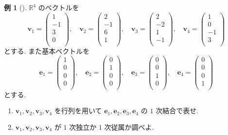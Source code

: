 \documentclass[dvipdfmx,a4paper,11pt]{article} %
\theoremstyle{definition}
\newtheorem{eg}[thm]{例}
\begin{document}
\begin{eg}[{\cite[例題4.2.2]{M}}] 
\(\mathbb{R}^4\) のベクトルを
\[
\bm{v}_1=
\begin{pmatrix}
1\\
 -1\\ 
 3 \\
 0\\
 \end{pmatrix},
\quad
\bm{v}_2=
\begin{pmatrix}
2\\
 -1\\ 
 6 \\
 1\\
 \end{pmatrix},
\quad
\bm{v}_3=
\begin{pmatrix}
2\\
 -2\\ 
 1 \\
 -1\\
 \end{pmatrix},
\quad
\bm{v}_4 =
\begin{pmatrix}
1\\
 0\\ 
 -1\\
 3\\
 \end{pmatrix}
\]
とする. 
また基本ベクトルを
$$
\bm{e}_1=
\begin{pmatrix}
1\\
 0\\ 
 0 \\
 0\\
 \end{pmatrix},
\quad
\bm{e}_2=
\begin{pmatrix}
0\\
 1\\ 
 0 \\
 0\\
 \end{pmatrix},
\quad
\bm{e}_3=
\begin{pmatrix}
0\\
 0\\ 
 1 \\
 0\\
 \end{pmatrix},
\quad
\bm{e}_4 =
\begin{pmatrix}
0\\
 0\\ 
 0\\
 1\\
 \end{pmatrix}
$$
とする.
\begin{enumerate}
\item \(\bm{v}_1,\bm{v}_2,\bm{v}_3,\bm{v}_4\) を行列を用いて \(\bm{e}_1,\bm{e}_2,\bm{e}_3,\bm{e}_4\) の \(1\) 次結合で表せ.
\item \(\bm{v}_1,\bm{v}_2,\bm{v}_3,\bm{v}_4\) が \(1\) 次独立か \(1\) 次従属か調べよ.
\end{enumerate}


\end{eg}
\end{document}
